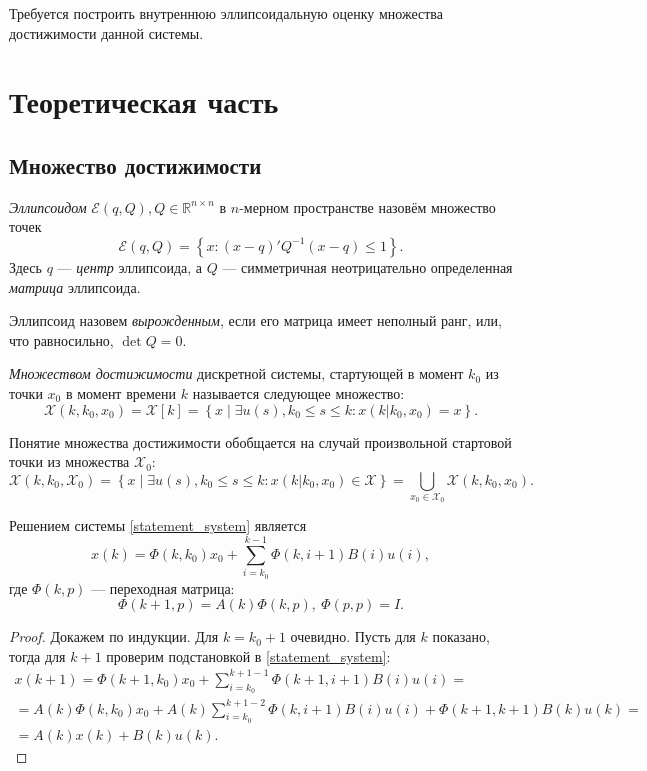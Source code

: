 \documentclass[10pt, a4paper]{article}
\renewcommand{\ell}{\mathcal{E}}
\begin{document}
Требуется построить внутреннюю эллипсоидальную оценку множества достижимости данной системы.

\section{Теоретическая часть}
\subsection{Множество достижимости}
\begin{df}
\textit{Эллипсоидом} $\ell(q,Q), Q\in\mathbb{R}^{n\times n}$ в $n$-мерном пространстве назовём множество точек
\[ \ell(q,Q) = \left\{ x\colon (x-q)'Q^{-1}(x-q) \leqslant 1 \right\}. \]
Здесь $q$ --- \textit{центр} эллипсоида, а $Q$ --- симметричная неотрицательно определенная \textit{матрица} эллипсоида. 
\end{df}
Эллипсоид назовем \textit{вырожденным}, если его матрица имеет неполный ранг, или, что равносильно, $\det Q = 0$.
\begin{df}
\textit{Множеством достижимости} дискретной системы, стартующей в момент $k_0$ из точки $x_0$ в момент времени $k$ называется следующее множество:
\[ \mathcal{X}(k,k_0,x_0) = \mathcal{X}[k] = \left\{ x \middle| \exists u(s), k_0\leqslant s\leqslant k\colon x(k|k_0,x_0)=x \right\}.\]
\end{df}
Понятие множества достижимости обобщается на случай произвольной стартовой точки из множества $\mathcal{X}_0$:
\[ \mathcal{X}(k,k_0,\mathcal{X}_0) = \left\{ x \middle| \exists u(s), k_0\leqslant s\leqslant k\colon x(k|k_0,x_0)\in \mathcal{X} \right\} = \bigcup\limits_{x_0\in\mathcal{X}_0}\mathcal{X}(k,k_0,x_0).\]
\begin{theorem}
Решением системы \eqref{statement_system} является 
\begin{equation}\label{solution}
	x(k) = \Phi(k,k_0)x_0 + \sum\limits_{i=k_0}^{k-1}\Phi(k,i+1)B(i)u(i),
\end{equation} 
где $\Phi(k,p)$ --- переходная матрица:
\begin{equation}\label{solution}
	\Phi(k+1,p) = A(k)\Phi(k,p),\ \Phi(p,p)=I.
\end{equation}
\end{theorem}
\begin{proof}
	Докажем по индукции. Для $k=k_0+1$ очевидно. Пусть для $k$ показано, тогда для $k+1$
	проверим подстановкой в \eqref{statement_system}:
	\begin{gather*}
		{x}(k+1) = \Phi(k+1,k_0)x_0 + \sum\limits_{i=k_0}^{k+1-1}\Phi(k+1,i+1)B(i)u(i) = 
		\\ = A(k)\Phi(k,k_0)x_0 + A(k)\sum\limits_{i=k_0}^{k+1-2}\Phi(k,i+1)B(i)u(i) + 
		\Phi(k+1,k+1)B(k)u(k) = \\ = A(k)x(k) + B(k)u(k).
	\end{gather*}
\end{proof}
\end{document}
